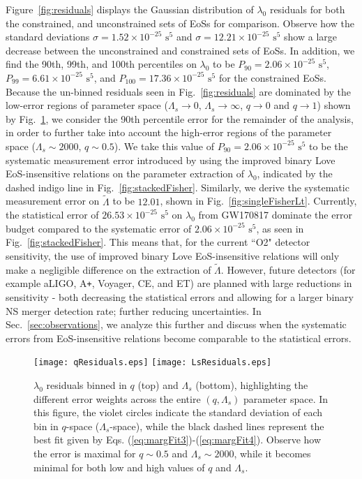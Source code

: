 \documentclass[prd,twocolumn,nofootinbib,superscriptaddress,amsmath,amssymb]{revtex4-1}
\begin{document}
Figure~\ref{fig:residuals} displays the Gaussian distribution of $\lambda_0$ residuals for both the constrained, and unconstrained sets of EoSs for comparison.
Observe how the standard deviations $\sigma=1.52\times10^{-25} \text{ s}^5$ and $\sigma=12.21\times10^{-25} \text{ s}^5$ show a large decrease between the unconstrained and constrained sets of EoSs.
In addition, we find the 90th, 99th, and 100th percentiles on $\lambda_0$ to be $P_{90}=2.06\times10^{-25} \text{ s}^5$, $P_{99}=6.61\times10^{-25} \text{ s}^5$, and $P_{100}=17.36\times10^{-25} \text{ s}^5$ for the constrained EoSs.
Because the un-binned residuals seen in Fig.~\ref{fig:residuals} are dominated by the low-error regions of parameter space ($\Lambda_s \rightarrow 0$, $\Lambda_s \rightarrow \infty$, $q \rightarrow 0$ and $q \rightarrow 1$) shown by Fig.~\ref{fig:qLsResiduals}, we consider the 90th percentile error for the remainder of the analysis, in order to further take into account the high-error regions of the parameter space ($\Lambda_s \sim 2000$, $q\sim0.5$).
We take this value of $P_{90}=2.06\times10^{-25} \text{ s}^5$ to be the systematic measurement error introduced by using the improved binary Love EoS-insensitive relations on the parameter extraction of $\lambda_0$, indicated by the dashed indigo line in Fig.~\ref{fig:stackedFisher}.
Similarly, we derive the systematic measurement error on $\tilde\Lambda$ to be $12.01$, shown in Fig.~\ref{fig:singleFisherLt}.
Currently, the statistical error of $26.53 \times 10^{-25} \text{ s}^5$ on $\lambda_0$ from GW170817 dominate the error budget compared to the systematic error of $2.06\times10^{-25} \text{ s}^5$, as seen in Fig.~\ref{fig:stackedFisher}.
This means that, for the current ``O2" detector sensitivity, the use of improved binary Love EoS-insensitive relations will only make a negligible difference on the extraction of $\tilde\Lambda$.
However, future detectors (for example aLIGO, A\texttt{+}, Voyager, CE, and ET) are planned with large reductions in sensitivity - both decreasing the statistical errors and allowing for a larger binary NS merger detection rate; further reducing uncertainties.
In Sec.~\ref{sec:observations}, we analyze this further and discuss when the systematic errors from EoS-insensitive relations become comparable to the statistical errors.

\begin{figure}
\begin{center} 
\texttt{[image: qResiduals.eps]}
\texttt{[image: LsResiduals.eps]}
\end{center}
\caption{
$\lambda_0$ residuals binned in $q$ (top) and $\Lambda_s$ (bottom), highlighting the different error weights across the entire $(q,\Lambda_s)$ parameter space.
In this figure, the violet circles indicate the standard deviation of each bin in $q$-space ($\Lambda_s$-space), while the black dashed lines represent the best fit given by Eqs. (\ref{eq:margFit3})-(\ref{eq:margFit4}).
Observe how the error is maximal for $q\sim0.5$ and $\Lambda_s\sim2000$, while it becomes minimal for both low and high values of $q$ and $\Lambda_s$.
}
\label{fig:qLsResiduals}
\end{figure}
\end{document}
